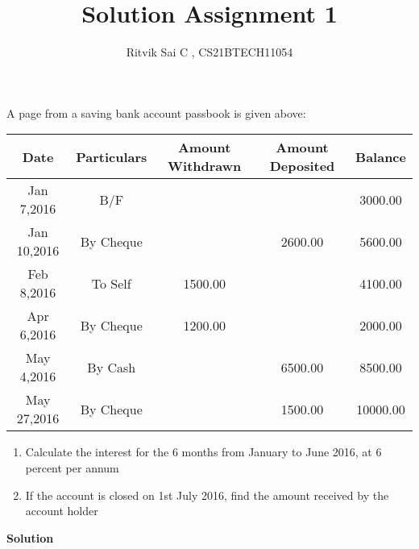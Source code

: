 \documentclass[journal,12pt,twocolumn]{IEEEtran}
\theoremstyle{remark}
\numberwithin{equation}{subsection}
\begin{document}
\title{Solution Assignment 1}
\author{Ritvik Sai C , CS21BTECH11054}
\maketitle

A page from a saving bank account passbook is given above:\\
\begin{table}[ht]
\centering
\begin{tabular}{|c|c|c|c|c|}
\hline
Date & Particulars & Amount Withdrawn & Amount Deposited & Balance\\
\hline
Jan 7,2016 & B/F & & & 3000.00\\
\hline
Jan 10,2016 & By Cheque & & 2600.00 & 5600.00\\
\hline
Feb 8,2016 & To Self & 1500.00 & & 4100.00\\
\hline
Apr 6,2016 & By Cheque & 1200.00 & & 2000.00\\
\hline
May 4,2016 & By Cash & & 6500.00 & 8500.00\\
\hline
May 27,2016 & By Cheque & & 1500.00 & 10000.00\\
\hline
\end{tabular}

\end{table}


\begin{enumerate}
\item Calculate the interest for the 6 months from January to June 2016, at 6 percent per annum\\
\item If the account is closed on 1st July 2016, find the amount received by the account holder\\
\end{enumerate}

\textbf{Solution}
\end{document}
